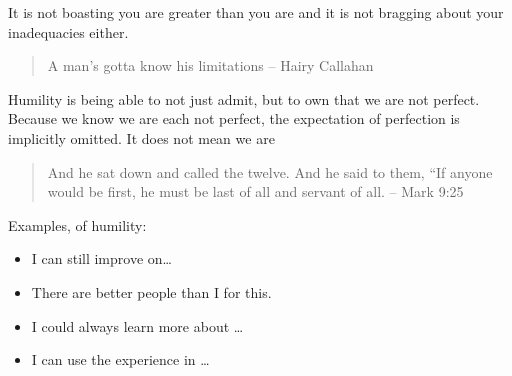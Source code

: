 \documentclass[11pt,a4paper,sans]{article}
\begin{document}
It is not boasting you are greater than you are and it is not bragging about your inadequacies either. 

\begin{quote}
    A man's gotta know his limitations -- Hairy Callahan
\end{quote}

Humility is being able to not just admit, but to own that we are not perfect. Because we know we are each not perfect, the expectation of perfection is implicitly omitted. It does not mean we are 

\begin{quote}
 And he sat down and called the twelve. And he said to them, “If anyone would be first, he must be last of all and servant of all. -- Mark 9:25
\end{quote}
Examples, of humility:
\begin{itemize}
    \item I can still improve on\ldots
    \item There are better people than I for this.
    \item I could always learn more about \ldots
    \item I can use the experience in \ldots
\end{itemize}
\end{document}
